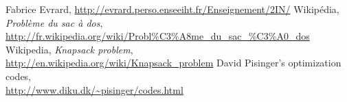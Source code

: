   Fabrice Evrard, \url{http://evrard.perso.enseeiht.fr/Enseignement/2IN/}
  Wikipédia, \emph{Problème du sac à dos},\\
  \url{http://fr.wikipedia.org/wiki/Probl\%C3\%A8me_du_sac_\%C3\%A0_dos}
  Wikipedia, \emph{Knapsack problem},\\
  \url{http://en.wikipedia.org/wiki/Knapsack_problem}
  David Pisinger's optimization codes,\\
  \url{http://www.diku.dk/~pisinger/codes.html}
